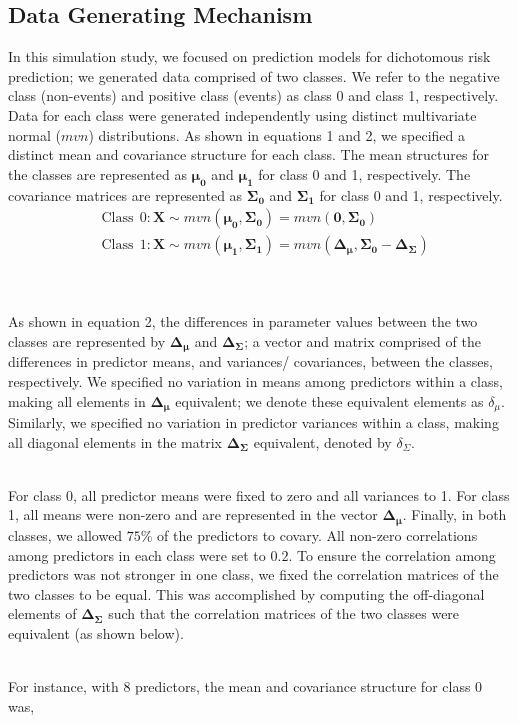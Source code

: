 \documentclass[AMA,STIX1COL,]{WileyNJD-v2}
\begin{document}
\hypertarget{data-generating-mechanism}{%
\subsection{Data Generating Mechanism}\label{data-generating-mechanism}}

In this simulation study, we focused on prediction models for
dichotomous risk prediction; we generated data comprised of two classes.
We refer to the negative class (non-events) and positive class (events)
as class 0 and class 1, respectively. Data for each class were generated
independently using distinct multivariate normal (\(mvn\))
distributions. As shown in equations 1 and 2, we specified a distinct
mean and covariance structure for each class. The mean structures for
the classes are represented as \(\pmb{\mu_0}\) and \(\pmb{\mu_1}\) for
class 0 and 1, respectively. The covariance matrices are represented as
\(\pmb{\Sigma_0}\) and \(\pmb{\Sigma_1}\) for class 0 and 1,
respectively.\\

\begin{align}
&\mathrm{Class \ \  0:} \mathbf{X} \sim mvn( \pmb{\mu_0}, \pmb{\Sigma_0}) = mvn(\pmb{0}, \pmb{\Sigma_0}) \\
&\mathrm{Class \ \  1:} \mathbf{X} \sim mvn( \pmb{\mu_1}, \pmb{\Sigma_1}) = mvn(\pmb{\Delta_\mu}, \pmb{\Sigma_0} - \pmb{\Delta_\Sigma})
\end{align}\\
\strut \\
As shown in equation 2, the differences in parameter values between the
two classes are represented by \(\pmb{\Delta_\mu}\) and
\(\pmb{\Delta_\Sigma}\); a vector and matrix comprised of the
differences in predictor means, and variances/ covariances, between the
classes, respectively. We specified no variation in means among
predictors within a class, making all elements in \(\pmb{\Delta_\mu}\)
equivalent; we denote these equivalent elements as \(\delta_\mu\).
Similarly, we specified no variation in predictor variances within a
class, making all diagonal elements in the matrix
\(\pmb{\Delta_\Sigma}\) equivalent, denoted by \(\delta_\Sigma\).\\
\strut \\
For class 0, all predictor means were fixed to zero and all variances to
1. For class 1, all means were non-zero and are represented in the
vector \(\pmb{\Delta_\mu}\). Finally, in both classes, we allowed
\(75\)\% of the predictors to covary. All non-zero correlations among
predictors in each class were set to \(0.2\). To ensure the correlation
among predictors was not stronger in one class, we fixed the correlation
matrices of the two classes to be equal. This was accomplished by
computing the off-diagonal elements of \(\pmb{\Delta_\Sigma}\) such that
the correlation matrices of the two classes were equivalent (as shown
below).\\
\strut \\
For instance, with 8 predictors, the mean and covariance structure for
class 0 was,\\
\end{document}
